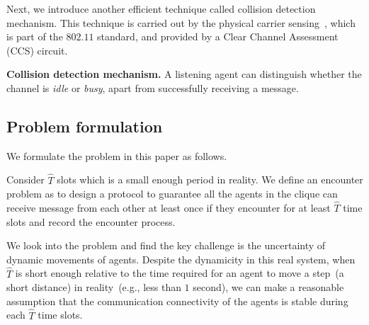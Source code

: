 



 

Next, we introduce another efficient technique called collision detection mechanism.
This technique is carried out by the physical carrier sensing~\cite{Yang2005On}, which is part of 
the $802.11$ standard, and provided by a Clear Channel Assessment (CCS) circuit.

\textbf{Collision detection mechanism.}
A listening agent can distinguish whether the channel is \emph{idle} or \emph{busy}, 
apart from successfully receiving a message. 

\subsection{Problem formulation}

We formulate the problem in this paper as follows.
\begin{problem}
    Consider $\hat{T}$ slots which is a small enough period in reality.
    We define an encounter problem as to design a protocol to guarantee 
    all the agents in the clique can receive message from each other at least once 
    if they encounter for at least $\hat{T}$ time slots and record the encounter process. 
\end{problem}


We look into the problem and find the key challenge is 
the uncertainty of dynamic movements
of agents. Despite the dynamicity in this real system, 
when $\hat{T}$ is short enough relative to 
the time required for an agent to move a step~(a short distance)
in reality~(e.g., less than $1$ second),
we can make a reasonable assumption that the communication 
connectivity of the agents is stable during each $\hat{T}$ time slots. 

